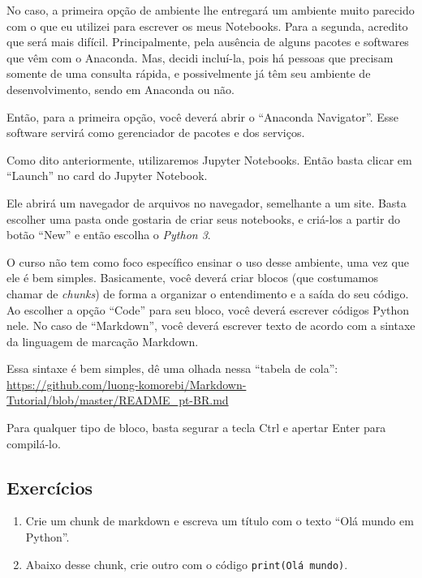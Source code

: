 \documentclass[a4paper, 11pt, brazilian]{article}
\providecommand{\tightlist}{%
      \setlength{\itemsep}{0pt}\setlength{\parskip}{0pt}}
\begin{document}
No caso, a primeira opção de ambiente lhe entregará um ambiente muito
parecido com o que eu utilizei para escrever os meus Notebooks. Para a
segunda, acredito que será mais difícil. Principalmente, pela ausência
de alguns pacotes e softwares que vêm com o Anaconda. Mas, decidi
incluí-la, pois há pessoas que precisam somente de uma consulta rápida,
e possivelmente já têm seu ambiente de desenvolvimento, sendo em
Anaconda ou não.

Então, para a primeira opção, você deverá abrir o ``Anaconda
Navigator''. Esse software servirá como gerenciador de pacotes e dos
serviços.

Como dito anteriormente, utilizaremos Jupyter Notebooks. Então basta
clicar em ``Launch'' no card do Jupyter Notebook.

Ele abrirá um navegador de arquivos no navegador, semelhante a um site.
Basta escolher uma pasta onde gostaria de criar seus notebooks, e
criá-los a partir do botão ``New'' e então escolha o \emph{Python 3}.

O curso não tem como foco específico ensinar o uso desse ambiente, uma
vez que ele é bem simples. Basicamente, você deverá criar blocos (que
costumamos chamar de \emph{chunks}) de forma a organizar o entendimento
e a saída do seu código. Ao escolher a opção ``Code'' para seu bloco,
você deverá escrever códigos Python nele. No caso de ``Markdown'', você
deverá escrever texto de acordo com a sintaxe da linguagem de marcação
Markdown.

Essa sintaxe é bem simples, dê uma olhada nessa ``tabela de cola'':
\url{https://github.com/luong-komorebi/Markdown-Tutorial/blob/master/README_pt-BR.md}

Para qualquer tipo de bloco, basta segurar a tecla Ctrl e apertar Enter
para compilá-lo.

    \hypertarget{exercuxedcios}{%
\subsection{Exercícios}\label{exercuxedcios}}

\begin{enumerate}
\def\labelenumi{\arabic{enumi}.}
\tightlist
\item
  Crie um chunk de markdown e escreva um título com o texto ``Olá mundo
  em Python''.
\item
  Abaixo desse chunk, crie outro com o código
  \texttt{print(\textquotesingle{}Olá\ mundo\textquotesingle{})}.
\end{enumerate}
\end{document}
